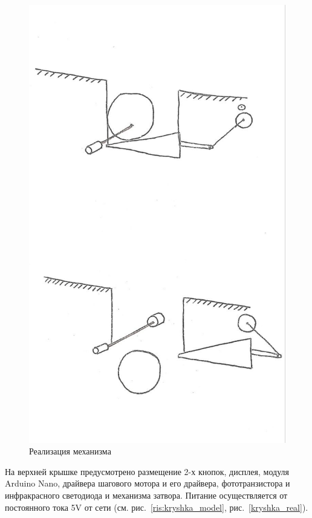 \begin{figure}[H]
	\centering
	\includegraphics[width=12cm]{scheme_idea.jpg}
	\caption{Реализация механизма}
	\label{ris:mechan}
\end{figure}
\par\medskip

На верхней крышке предусмотрено размещение 2-х кнопок, дисплея, модуля Arduino Nano, драйвера шагового мотора и его драйвера, фототранзистора и инфракрасного светодиода и механизма затвора. Питание осуществляется от постоянного тока 5V от сети (см. рис.~\ref{ris:kryshka_model}, рис.~\ref{kryshka_real}).  

